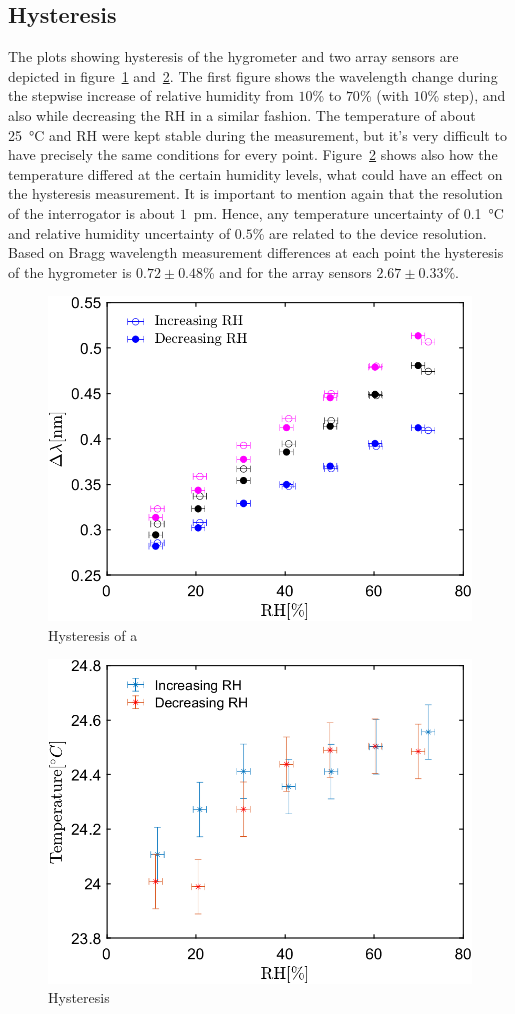 \subsection{Hysteresis}
The plots showing hysteresis of the hygrometer and two array sensors are depicted in figure~\ref{fig_hysteresis} and~\ref{fig_hysteresis2}. The first figure shows the wavelength change during the stepwise increase of relative humidity from $10$\% to $70$\% (with $10$\% step), and also while decreasing the \gls{RH} in a similar fashion. The temperature of about \SI{25}{\celsius} and \gls{RH} were kept stable during the measurement, but it's very difficult to have precisely the same conditions for every point.  Figure~\ref{fig_hysteresis2} shows also how the temperature differed at the certain humidity levels, what could have an effect on the hysteresis measurement. It is important to mention again that the resolution of the interrogator is about $1$~pm. Hence, any temperature uncertainty of \SI{0.1}{\celsius} and relative humidity uncertainty of $0.5$\% are related to the device resolution. Based on Bragg wavelength measurement differences at each point the hysteresis of the hygrometer is $0.72\pm0.48$\% and for the array sensors $2.67\pm0.33$\%. 

\begin{figure}[!h]
\centering
\includegraphics[width=0.6\columnwidth]{Chapter5/images/25_RHS.png}
\caption{Hysteresis of a }
\label{fig_hysteresis}
\end{figure}

\begin{figure}[!h]
\centering
\includegraphics[width=0.6\columnwidth]{Chapter5/images/25_RHST.png}
\caption{Hysteresis}
\label{fig_hysteresis2}
\end{figure}

